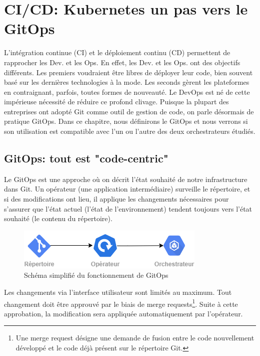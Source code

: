 \documentclass[11pt,fleqn]{book} %
\begin{document}
\chapter{CI/CD: Kubernetes un pas vers le GitOps}
\vspace{-2cm}
L'intégration continue (CI) et le déploiement continu (CD) permettent de rapprocher les Dev. et les Ops. En effet, les Dev. et les Ops. ont des objectifs différents. Les premiers voudraient être libres de déployer leur code, bien souvent basé sur les dernières technologies à la mode. Les seconds gèrent les plateformes en contraignant, parfois, toutes formes de nouveauté. Le DevOps est né de cette impérieuse nécessité de réduire ce profond clivage. Puisque la plupart des entreprises ont adopté Git comme outil de gestion de code, on parle désormais de pratique GitOps. Dans ce chapitre, nous définirons le GitOps et nous verrons si son utilisation est compatible avec l'un ou l'autre des deux orchestrateurs étudiés.

\section{GitOps: tout est "code-centric"}
Le GitOps est une approche où on décrit l’état souhaité de notre infrastructure dans Git. Un opérateur (une application intermédiaire) surveille le répertoire, et si des modifications ont lieu, il applique les changements nécessaires pour s’assurer que l'état actuel (l’état de l’environnement) tendent toujours vers l’état souhaité (le contenu du répertoire). 

\begin{figure}[H]\centering
\renewcommand{\figurename}{Schéma}
\includegraphics[scale=0.8]{Pictures/CI-CD/gitops-Intro.png}
\captionsetup{margin=1.5cm,format=hang,justification=justified}
\caption[]{Schéma simplifié du fonctionnement de GitOps \newline}
\end{figure}

Les changements via l’interface utilisateur sont limités au maximum. Tout changement doit être approuvé par le biais de merge requests\footnote{Une merge request désigne une demande de fusion entre le code nouvellement développé et le code déjà présent sur le répertoire Git.}. Suite à cette approbation, la modification sera appliquée automatiquement par l’opérateur.\\
\end{document}
